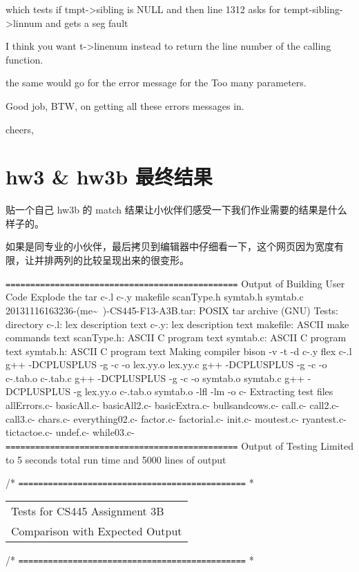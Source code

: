 \documentclass[12pt]{book}
\begin{document}
which tests if tmpt->sibling is NULL and then line 1312 asks for tempt-sibling->linnum  and gets a seg fault

I think you want t->linenum  instead to return the line number of the calling function.

the same would go for the error message for the Too many parameters.

Good job, BTW, on getting all these errors messages in.

cheers,

\chapter{hw3 \& hw3b 最终结果}
\label{sec-30}

贴一个自己 hw3b 的 match 结果让小伙伴们感受一下我们作业需要的结果是什么样子的。

如果是同专业的小伙伴，最后拷贝到编辑器中仔细看一下，这个网页因为宽度有限，让并排两列的比较呈现出来的很变形。

\texttt{===============================================}
Output of Building User Code
Explode the tar
c-.l
c-.y
makefile
scanType.h
symtab.h
symtab.c
20131116163236-(me\textasciitilde{}~)-CS445-F13-A3B.tar: POSIX tar archive (GNU)
Tests:                                  directory
c-.l:                                   lex description text
c-.y:                                   lex description text
makefile:                               ASCII make commands text
scanType.h:                             ASCII C program text
symtab.c:                               ASCII C program text
symtab.h:                               ASCII C program text
Making compiler
bison -v -t -d c-.y  
flex c-.l
g++ -DCPLUSPLUS -g        -c -o lex.yy.o lex.yy.c
g++ -DCPLUSPLUS -g        -c -o c-.tab.o c-.tab.c
g++ -DCPLUSPLUS -g        -c -o symtab.o symtab.c
g++ -DCPLUSPLUS -g      lex.yy.o c-.tab.o symtab.o -lfl -lm  -o c- 
Extracting test files
allErrors.c-
basicAll.c-
basicAll2.c-
basicExtra.c-
bullsandcows.c-
call.c-
call2.c-
call3.c-
chars.c-
everything02.c-
factor.c-
factorial.c-
init.c-
moutest.c-
ryantest.c-
tictactoe.c-
undef.c-
while03.c-
\texttt{===============================================}
Output of Testing
Limited to 5 seconds total run time and 5000 lines of output

/* \texttt{==============================================} *
\begin{center}
\begin{tabular}{l}
Tests for CS445 Assignment 3B\\
Comparison with Expected Output\\
\end{tabular}
\end{center}
/* \texttt{==============================================} *
\end{document}
